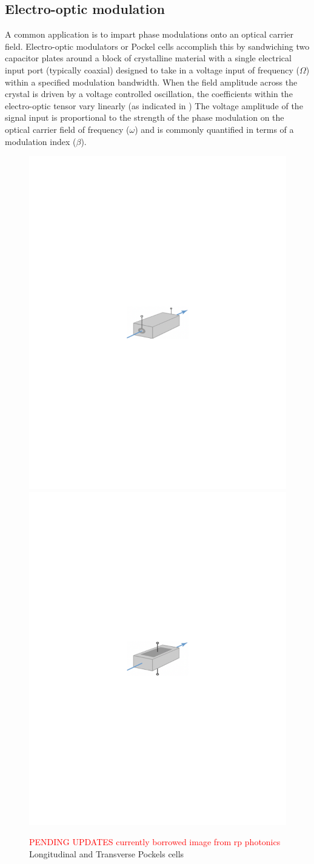 \subsection{Electro-optic modulation}\label{sec:EOM}
A common application is to impart phase modulations onto an optical carrier field. Electro-optic modulators or Pockel cells accomplish this by sandwiching two capacitor plates around a block of crystalline material with a single electrical input port (typically coaxial) designed to take in a voltage input of frequency ($\Omega$) within a specified modulation bandwidth. When the field amplitude across the crystal is driven by a voltage controlled oscillation, the coefficients within the electro-optic tensor vary linearly (as indicated in \cite{}) The voltage amplitude of the signal input is proportional to the strength of the phase modulation on the optical carrier field of frequency ($\omega$) and is commonly quantified in terms of a modulation index ($\beta$).

\begin{figure}[!h]
     \begin{subcaptiongroup}
	     \includegraphics[width=.5\textwidth]{figs/ALGAAS/temp/pockels_cell_l.pdf}
	     \label{pc_longitudinal}
	     \includegraphics[width=.5\textwidth]{figs/ALGAAS/temp/pockels_cell_t.pdf}
	     \label{pc_transverse}
     \end{subcaptiongroup}
    \caption{\textcolor{red}{PENDING UPDATES currently borrowed image from rp photonics} Longitudinal and Transverse Pockels cells}
    \label{fig:lpc_and_tpc}
\end{figure} 

